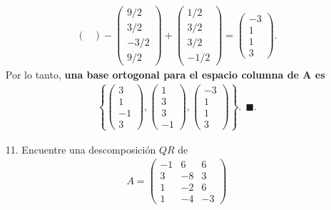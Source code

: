 \documentclass[11pt,letterpaper]{article}
\newcommand{\finf}{\blacksquare.}
\begin{document}
\begin{itemize}
\begin{align*}
\begin{pmatrix}
\end{pmatrix}-\begin{pmatrix}
9/2\\ 3/2 \\-3/2\\9/2
\end{pmatrix}+\begin{pmatrix}
1/2\\ 3/2 \\3/2\\-1/2
\end{pmatrix}=\begin{pmatrix}
-3\\1\\1\\3
\end{pmatrix}.
\end{align*}
Por lo tanto, \textbf{una base ortogonal para el espacio columna de A es }
\begin{align*}
\left\{\begin{pmatrix}
3\\ 1\\-1\\3
\end{pmatrix} ,\begin{pmatrix}
1\\ 3 \\3\\-1
\end{pmatrix},\begin{pmatrix}
-3\\1\\1\\3
\end{pmatrix}\right\}. \ \ \finf
\end{align*}

\item[11.] Encuentre una descomposición $QR$ de 
\begin{align*}
A=\begin{pmatrix}
-1 & 6 & 6\\
 3 &-8 & 3\\
 1 &-2 & 6\\
 1 &-4 &-3 
\end{pmatrix}
\end{align*}


\end{itemize}
\end{document}
